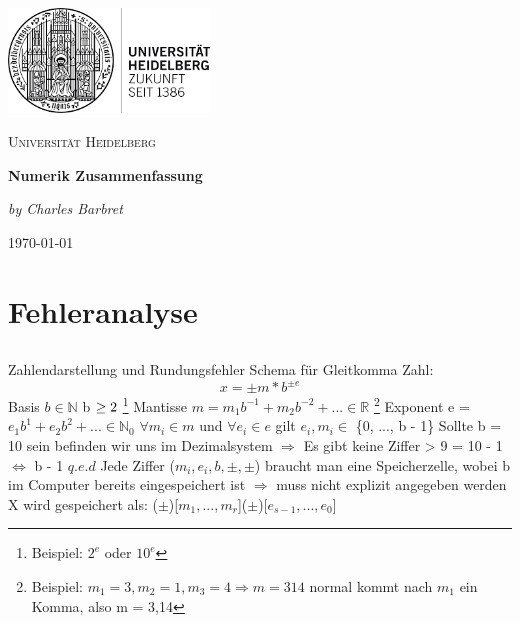 \documentclass[12pt,a4paper]{article} %
\begin{document}
	\begin{titlepage} %
	\centering
	\includegraphics[width=0.40\textwidth]{UniLogo}\par\vspace{1cm}
		{\scshape\LARGE Universität Heidelberg \par}
		\vspace{1cm}
		{\huge\bfseries Numerik Zusammenfassung \par}
		\vspace{2cm}
		{\Large\itshape by Charles Barbret \par}
		
		\vfill

		{\large \gerDate\today\par}
	\end{titlepage}

	\tableofcontents %
	\newpage %
	
	
	\section{Fehleranalyse}
	\subsection{}
	Zahlendarstellung und Rundungsfehler Schema für Gleitkomma Zahl:
	\begin{dmath}
		x = \pm m * b^{\pm e}
	\end{dmath}
	Basis $b \in \mathbb{N}$ \space b $\geq 2 \space $ \footnote{Beispiel: $ 2^e$ oder $10^e $}
	\newline
	Mantisse $ m = m_1 b^{-1} + m_2 b^{-2} + ... \in \mathbb{R} $ \footnote{ Beispiel: $ m_1 = 3, m_2 = 1, m_3 = 4 \Rightarrow m = 314 $ normal kommt nach $ m_1 $ ein Komma, also m = 3,14}
	\newline
	Exponent e = $e_1 b^{1} + e_2 b^{2} + ... \in \mathbb{N}_0 $
	\newline
	$ \forall m_i \in m $ und $ \forall e_i \in e $ gilt $e_i , m_i \in $ \{0, ..., b - 1\}
	\newline
	Sollte b = 10 sein befinden wir uns im Dezimalsystem
	\newline \indent 
	$\Rightarrow$ Es gibt keine Ziffer > 9 = 10 - 1 $\Leftrightarrow$ b - 1 $q.e.d$
	\newline
	Jede Ziffer ($m_i , e_i , b, \pm, \pm$) braucht man eine Speicherzelle, wobei b im Computer bereits eingespeichert ist
	\newline \indent 
	$\Rightarrow $ muss nicht explizit angegeben werden
	\newline
	X wird gespeichert als: ($\pm$)[$m_1 , ..., m_r $]($\pm$)[$e_{s - 1} , ..., e_0 $]
	
\end{document}

